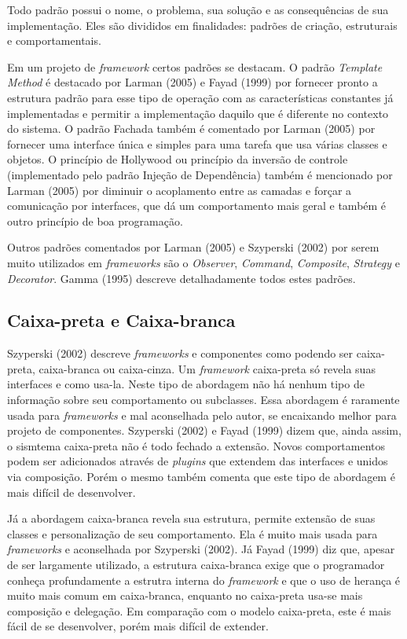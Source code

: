 Todo padrão possui o nome, o problema, sua solução e as consequências de sua implementação. Eles são divididos em finalidades: padrões de criação, estruturais e comportamentais.

Em um projeto de \textit{framework} certos padrões se destacam. O padrão \textit{Template Method} é destacado por Larman (2005) e Fayad (1999) por fornecer pronto a estrutura padrão para esse tipo de operação com as características constantes já implementadas e permitir a implementação daquilo que é diferente no contexto do sistema. O padrão Fachada também é comentado por Larman (2005) por fornecer uma interface única e simples para uma tarefa que usa várias classes e objetos. O princípio de Hollywood ou princípio da inversão de controle (implementado pelo padrão Injeção de Dependência) também é mencionado por Larman (2005) por diminuir o acoplamento entre as camadas e forçar a comunicação por interfaces, que dá um comportamento mais geral e também é outro princípio de boa programação.

Outros padrões comentados por Larman (2005) e Szyperski (2002) por serem muito utilizados em \textit{frameworks} são o \textit{Observer}, \textit{Command}, \textit{Composite}, \textit{Strategy} e \textit{Decorator}. Gamma (1995) descreve detalhadamente todos estes padrões.

\subsection{Caixa-preta e Caixa-branca}

Szyperski (2002) descreve \textit{frameworks} e componentes como podendo ser caixa-preta, caixa-branca ou caixa-cinza. Um \textit{framework} caixa-preta só revela suas interfaces e como usa-la. Neste tipo de abordagem não há nenhum tipo de informação sobre seu comportamento ou subclasses. Essa abordagem é raramente usada para \textit{frameworks} e mal aconselhada pelo autor, se encaixando melhor para projeto de componentes. Szyperski (2002) e Fayad (1999) dizem que, ainda assim, o sismtema caixa-preta não é todo fechado a extensão. Novos comportamentos podem ser adicionados através de \textit{plugins} que extendem das interfaces e unidos via composição. Porém o mesmo também comenta que este tipo de abordagem é mais difícil de desenvolver.

Já a abordagem caixa-branca revela sua estrutura, permite extensão de suas classes e personalização de seu comportamento. Ela é muito mais usada para \textit{frameworks} e aconselhada por Szyperski (2002). Já Fayad (1999) diz que, apesar de ser largamente utilizado, a estrutura caixa-branca exige que o programador conheça profundamente a estrutra interna do \textit{framework} e que o uso de herança é muito mais comum em caixa-branca, enquanto no caixa-preta usa-se mais composição e delegação. Em comparação com o modelo caixa-preta, este é mais fácil de se desenvolver, porém mais difícil de extender.

